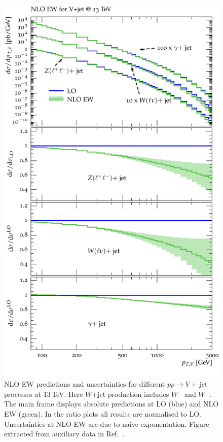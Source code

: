 \documentclass[a4paper,11pt,notoc]{article}
\begin{document}
\begin{figure}[t!]
\centering
\includegraphics[width=0.495\columnwidth]{all_EW.pdf} 
\caption{NLO EW predictions and uncertainties for different $pp\to V+$\,jet 
processes at 13\,TeV.
Here $W$+jet production includes $W^-$ and $W^+$.
The main frame displays absolute predictions at LO (blue) and NLO EW (green).
In the ratio plots all results are normalised to LO.
Uncertainties at NLO EW are due to naive exponentation. Figure extracted from auxiliary data in Ref.~\cite{Lindert:2017olm}.}
\label{fig:NLOEW_pTV}
\end{figure}   
\end{document}

